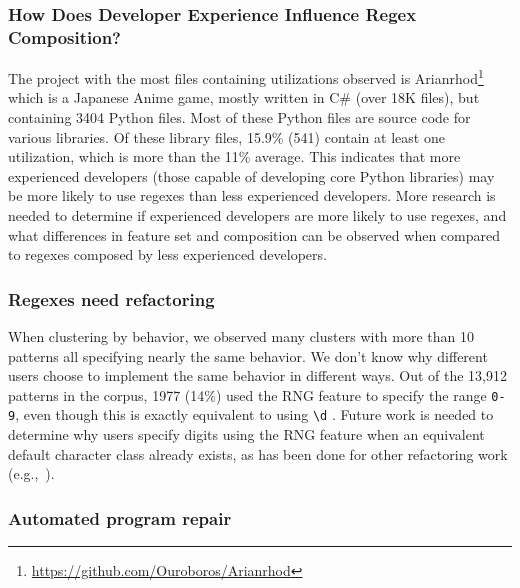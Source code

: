 \subsubsection{How Does Developer Experience Influence Regex Composition?}
The project with the most files containing utilizations observed is Arianrhod\footnote{\url{https://github.com/Ouroboros/Arianrhod}} which is a Japanese Anime game, mostly written in C\# (over 18K files), but containing 3404 Python files.  Most of these Python files are source code for various libraries.  Of these library files, 15.9\% (541) contain at least one utilization, which is more than the 11\% average.  This indicates that more experienced developers (those capable of developing core Python libraries) may be more likely to use regexes than less experienced developers.  More research is needed to determine if experienced developers are more likely to use regexes, and what differences in feature set and composition can be observed when compared to regexes composed by less experienced developers.

\subsubsection{Regexes need refactoring}
When clustering by behavior, we observed many clusters with more than 10 patterns all specifying nearly the same behavior.  We don't know why different users choose to implement the same behavior in different ways.  Out of the 13,912 patterns in the corpus, 1977 (14\%) used the RNG feature to specify the range \verb?0-9?, even though this is exactly equivalent to using \verb?\d? .  Future work is needed to determine why users specify digits using the RNG feature when an equivalent default character class already exists, as has been done for other refactoring work (e.g.,~\cite{StoleeTSE2013}).

\subsubsection{Automated program repair}











